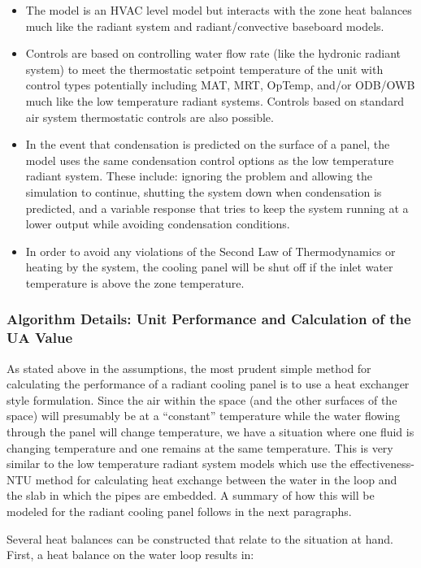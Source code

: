 \begin{itemize}
\item
  The model is an HVAC level model but interacts with the zone heat balances much like the radiant system and radiant/convective baseboard models.
\item
  Controls are based on controlling water flow rate (like the hydronic radiant system) to meet the thermostatic setpoint temperature of the unit with control types potentially including MAT, MRT, OpTemp, and/or ODB/OWB much like the low temperature radiant systems.  Controls based on standard air system thermostatic controls are also possible.
\item
  In the event that condensation is predicted on the surface of a panel, the model uses the same condensation control options as the low temperature radiant system.  These include: ignoring the problem and allowing the simulation to continue, shutting the system down when condensation is predicted, and a variable response that tries to keep the system running at a lower output while avoiding condensation conditions.
\item
  In order to avoid any violations of the Second Law of Thermodynamics or heating by the system, the cooling panel will be shut off if the inlet water temperature is above the zone temperature.
\end{itemize}

\subsubsection{Algorithm Details: Unit Performance and Calculation of the UA Value}\label{algorithm-details-unit-performance-and-calculation-of-the-ua-value}

As stated above in the assumptions, the most prudent simple method for calculating the performance of a radiant cooling panel is to use a heat exchanger style formulation.  Since the air within the space (and the other surfaces of the space) will presumably be at a “constant” temperature while the water flowing through the panel will change temperature, we have a situation where one fluid is changing temperature and one remains at the same temperature.  This is very similar to the low temperature radiant system models which use the effectiveness-NTU method for calculating heat exchange between the water in the loop and the slab in which the pipes are embedded.  A summary of how this will be modeled for the radiant cooling panel follows in the next paragraphs.

Several heat balances can be constructed that relate to the situation at hand.  First, a heat balance on the water loop results in:

